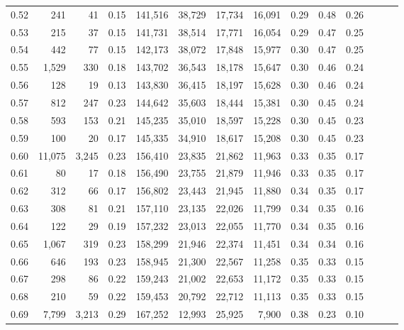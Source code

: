 \begin{tabular}{rrrrrrrrrrrrrr}
0.52 &     241 &     41 &  0.15 &  141,516 &   38,729 &  17,734 &  16,091 &  0.29 &  0.48 &      0.26 \\
0.53 &     215 &     37 &  0.15 &  141,731 &   38,514 &  17,771 &  16,054 &  0.29 &  0.47 &      0.25 \\
0.54 &     442 &     77 &  0.15 &  142,173 &   38,072 &  17,848 &  15,977 &  0.30 &  0.47 &      0.25 \\
0.55 &   1,529 &    330 &  0.18 &  143,702 &   36,543 &  18,178 &  15,647 &  0.30 &  0.46 &      0.24 \\
0.56 &     128 &     19 &  0.13 &  143,830 &   36,415 &  18,197 &  15,628 &  0.30 &  0.46 &      0.24 \\
0.57 &     812 &    247 &  0.23 &  144,642 &   35,603 &  18,444 &  15,381 &  0.30 &  0.45 &      0.24 \\
0.58 &     593 &    153 &  0.21 &  145,235 &   35,010 &  18,597 &  15,228 &  0.30 &  0.45 &      0.23 \\
0.59 &     100 &     20 &  0.17 &  145,335 &   34,910 &  18,617 &  15,208 &  0.30 &  0.45 &      0.23 \\
0.60 &  11,075 &  3,245 &  0.23 &  156,410 &   23,835 &  21,862 &  11,963 &  0.33 &  0.35 &      0.17 \\
0.61 &      80 &     17 &  0.18 &  156,490 &   23,755 &  21,879 &  11,946 &  0.33 &  0.35 &      0.17 \\
0.62 &     312 &     66 &  0.17 &  156,802 &   23,443 &  21,945 &  11,880 &  0.34 &  0.35 &      0.17 \\
0.63 &     308 &     81 &  0.21 &  157,110 &   23,135 &  22,026 &  11,799 &  0.34 &  0.35 &      0.16 \\
0.64 &     122 &     29 &  0.19 &  157,232 &   23,013 &  22,055 &  11,770 &  0.34 &  0.35 &      0.16 \\
0.65 &   1,067 &    319 &  0.23 &  158,299 &   21,946 &  22,374 &  11,451 &  0.34 &  0.34 &      0.16 \\
0.66 &     646 &    193 &  0.23 &  158,945 &   21,300 &  22,567 &  11,258 &  0.35 &  0.33 &      0.15 \\
0.67 &     298 &     86 &  0.22 &  159,243 &   21,002 &  22,653 &  11,172 &  0.35 &  0.33 &      0.15 \\
0.68 &     210 &     59 &  0.22 &  159,453 &   20,792 &  22,712 &  11,113 &  0.35 &  0.33 &      0.15 \\
0.69 &   7,799 &  3,213 &  0.29 &  167,252 &   12,993 &  25,925 &   7,900 &  0.38 &  0.23 &      0.10 \\

\end{tabular}

